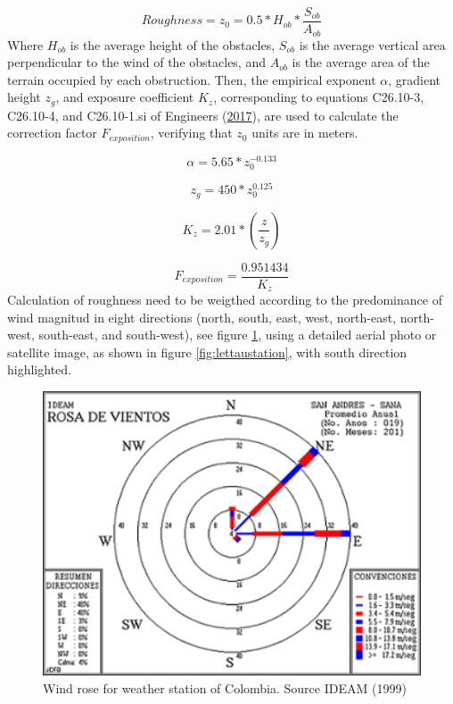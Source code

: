 \documentclass[12pt,oneside]{reedthesis}
\begin{document}
\[
Roughness = z_0= 0.5 * H_{ob}*\frac{S_{ob}}{A_{ob}}
\]
Where \(H_{ob}\) is the average height of the obstacles, \(S_{ob}\) is the average vertical area perpendicular to the wind of the obstacles, and \(A_{ob}\) is the average area of the terrain occupied by each obstruction. Then, the empirical exponent \(\alpha\), gradient height \(z_g\), and exposure coefficient \(K_z\), corresponding to equations C26.10-3, C26.10-4, and C26.10-1.si of Engineers (\protect\hyperlink{ref-Asce2017}{2017}), are used to calculate the correction factor \(F_{exposition}\), verifying that \(z_0\) units are in meters.

\[
\alpha =  5.65*z_0^{-0.133}
\]

\[
z_g=450*z_0^{0.125}
\]

\[
K_z= 2.01*\left(\frac{z}{z_g}\right)
\]

\[
F_{exposition} = \frac{0.951434}{K_z}
\]
Calculation of roughness need to be weigthed according to the predominance of wind magnitud in eight directions (north, south, east, west, north-east, north-west, south-east, and south-west), see figure \ref{fig:compassrose}, using a detailed aerial photo or satellite image, as shown in figure \ref{fig:lettaustation}, with south direction highlighted.

\footnotesize
\begin{figure}

{\centering \includegraphics[width=4.78in]{figure/viensanandres} 

}

\caption{Wind rose for weather station of Colombia. Source IDEAM (1999)}\label{fig:compassrose}
\end{figure}
\normalsize
\end{document}
